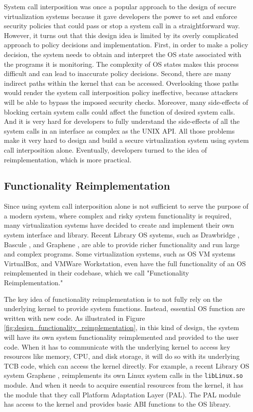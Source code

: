 System call interposition was once a popular approach to the design of secure
virtualization systems because it gave developers the power to set and enforce
security policies that could pass or stop a
system call in a straightforward way.  However, it turns out that this design
idea is limited by its overly complicated approach to policy decisions and implementation.
First, in order to make a policy decision, the system needs to
obtain and interpret the OS state associated with the programs it is monitoring.
The complexity of OS states makes this process difficult and can lead to
inaccurate policy decisions.
Second, there are many indirect paths within the kernel that can be accessed.
Overlooking those paths would render the
system call interposition policy ineffective, because attackers will be able to
bypass the imposed security checks. Moreover, many side-effects of blocking
certain system calls could affect the function of desired system calls. And
it is very hard for developers to fully understand the side-effects of all the
system calls in an interface as complex as the UNIX API. All those problems make
 it very hard to design and build a secure virtualization system using
system call interposition alone. Eventually, developers turned to the idea of
reimplementation, which is more practical.

\subsection {Functionality Reimplementation}
Since using system call interposition alone is not sufficient to serve the purpose of
a modern system, where complex and risky system functionality is required, many
virtualization systems have decided to create and implement their own system
interface and library. Recent Library OS systems, such as  Drawbridge \cite{Drawbridge-11},
 Bascule \cite{Bascule}, and Graphene \cite{Graphene-14}, are able to
provide richer functionality and run large and complex programs. Some virtualization
systems, such as OS VM systems VirtualBox, and VMWare Workstation, even have the
full functionality of an OS reimplemented in their codebase, which we call "Functionality
 Reimplementation."

The key idea of functionality reimplementation is to not fully rely on the underlying
kernel to provide system functions. Instead, essential OS function are written with new
code. As illustrated in Figure \ref{fig:design_functionality_reimplementation},
in this kind of design, the system will have its own system functionality reimplemented and
provided to the user code. When it has to communicate with the underlying kernel
to access key resources like memory, CPU, and disk storage, it will do so with
its underlying TCB code, which can access the kernel directly.
For example, a recent Library OS system Graphene \cite{Graphene-14}, reimplements
its own Linux system calls in the
\texttt{libLinux.so} module. And when it needs to acquire essential resources from
the kernel, it has the module that they call
Platform Adaptation Layer (PAL). The PAL module has access to the kernel
and provides basic ABI functions to the OS library.

